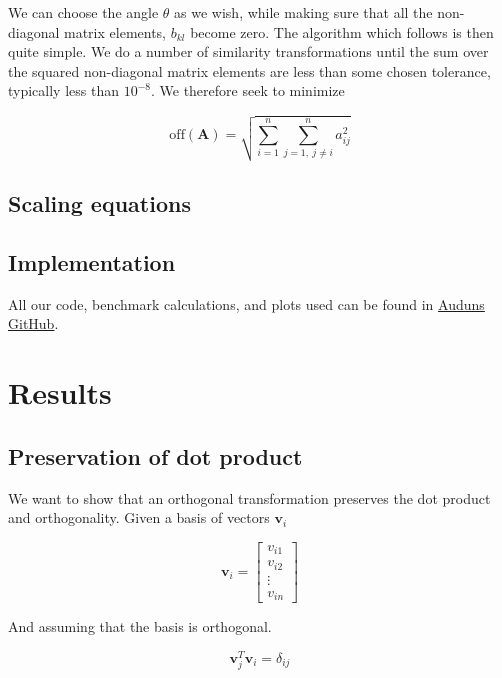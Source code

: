 \documentclass[a4paper, fontsize=11pt]{article}
\begin{document}
We can choose the angle $\theta$ as we wish, while making sure that all the non-diagonal matrix elements, $b_{kl}$ become zero. The algorithm which follows is then quite simple. We do a number of similarity transformations until the sum over the squared non-diagonal matrix elements are less than some chosen tolerance, typically less than $10^{-8}$. We therefore seek to minimize

\begin{equation}
\text{off}(\textbf{A}) = \sqrt{\sum^{n}_{i=1} \sum^{n}_{j=1, \: j \neq i} a_{ij}^{2}}
\end{equation}



\subsection{Scaling equations}



\subsection{Implementation}

All our code, benchmark calculations, and plots used can be found in \href{https://github.com/auduntre/FYS4150/tree/master/Project%202}{Auduns GitHub}.

\section{Results}
\subsection{Preservation of dot product}
We want to show that an orthogonal transformation preserves the dot product and orthogonality. Given a basis of vectors $\textbf{v}_{i}$

\begin{equation}
\textbf{v}_{i}=
\begin{bmatrix}
v_{i1} \\
v_{i2} \\
\vdots \\
v_{in}
\end{bmatrix}
\end{equation}

And assuming that the basis is orthogonal.

\begin{equation}
\textbf{v}^{T}_{j} \textbf{v}_{i} = \delta_{ij}
\end{equation}
\end{document}
